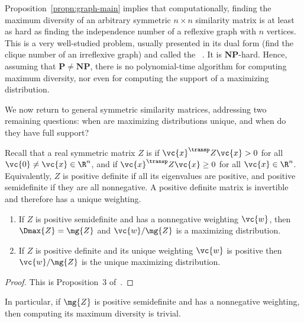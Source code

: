 \begin{remark}
Proposition~\ref{propn:graph-main} implies that computationally, finding
the maximum diversity of an arbitrary symmetric $n \times n$ similarity
matrix is at least as hard as finding the independence number of a
reflexive graph with $n$ vertices.  This is a very well-studied problem,
usually presented in its dual form (find the clique number of an
irreflexive graph) and called the 
~\cite{Karp}.  It is $\mathbf{NP}$-hard.  Hence, assuming
that $\mathbf{P} \neq \mathbf{NP}$, there is no polynomial-time algorithm
for computing maximum diversity, nor even for computing the support of a
maximizing distribution.
\end{remark}

We now return to general symmetric similarity matrices, addressing two
remaining questions: when are maximizing distributions unique, and when do
they have full support?

Recall that a real symmetric matrix $Z$ is  if $\vc{x}^\transp
Z \vc{x} > 0$ for all $\vc{0} \neq \vc{x} \in \R^n$, and %
% 
% 
if $\vc{x}^\transp Z \vc{x} \geq 0$ for all $\vc{x} \in 
\R^n$.  Equivalently, $Z$ is positive definite if all its eigenvalues are
positive, and positive semidefinite if they are all nonnegative.  A
positive definite matrix is invertible and therefore has a unique weighting.

\begin{propn}
\begin{enumerate}
\item 
If $Z$ is positive semidefinite and has a nonnegative weighting $\vc{w}$,
then $\Dmax{Z} = \mg{Z}$ and $\vc{w}/\mg{Z}$ is a maximizing distribution.

\item
If $Z$ is positive definite and its unique weighting $\vc{w}$ is positive
then $\vc{w}/\mg{Z}$ is the unique maximizing distribution.
\end{enumerate}
\end{propn}

\begin{proof}
This is Proposition~3 of~\cite{MDBB}.
\end{proof}

In particular, if $\mg{Z}$ is positive semidefinite and has a nonnegative
weighting, then computing its maximum diversity is trivial.

